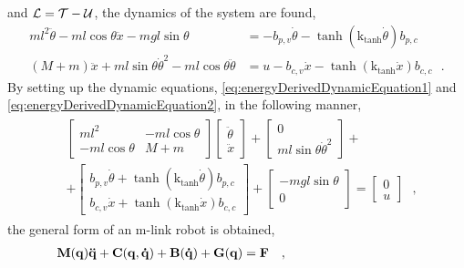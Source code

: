 and $\cal{L} = T-U$, the dynamics of the system are found,
\begin{align}
  m l^2 \ddot{\theta} - m l \cos \theta \ddot{x} - m g l \sin \theta  &= -b_{p,v} \dot{\theta} - \tanh(\text{k}_\text{tanh}\dot{\theta}) b_{p,c} \label{eq:energyDerivedDynamicEquation2} \\
  ( M + m )\ddot{x} + m l \sin \theta \dot{\theta}^2 - m l \cos \theta \ddot{\theta}  &=  u - b_{c,v} \dot{x} - \tanh(\text{k}_\text{tanh}\dot{x}) b_{c,c} \ \ \ .
  \label{eq:energyDerivedDynamicEquation1}
\end{align}
By setting up the dynamic equations, \autoref{eq:energyDerivedDynamicEquation1} and \ref{eq:energyDerivedDynamicEquation2}, in the following manner,
%
\begin{align}
\begin{split}
  &
  \begin{bmatrix}
    m l^2              & -m l \cos \theta  \\
    -m l \cos \theta   & M + m
  \end{bmatrix}
  \begin{bmatrix}
    \ddot{\theta}  \\
    \ddot{x}
  \end{bmatrix}
  +
  \begin{bmatrix}
    0  \\
    m l \sin \theta \dot{\theta}^2
  \end{bmatrix}
  +   \\
  &+
  \begin{bmatrix}
    b_{p,v} \dot{\theta} + \tanh(\text{k}_\text{tanh}\dot{\theta}) b_{p,c}    \\
    b_{c,v} \dot{x} + \tanh(\text{k}_\text{tanh}\dot{x}) b_{c,c}
  \end{bmatrix}
  +
  \begin{bmatrix}
    -m g l \sin \theta  \\
    0
  \end{bmatrix}
  =
  \begin{bmatrix}
    0  \\
    u
  \end{bmatrix} \ \ \ , 
\end{split}
\label{eq:thetaXdynamics}
\end{align}
%
the general form of an m-link robot is obtained, \cite{MWSpong, LSciavicco}
\begin{align}
  \vec{M}(\vec{q})\vec{\ddot{q}} + \vec{C}(\vec{q},\vec{\dot{q}}) + \vec{B}(\vec{\dot{q}}) + \vec{G}(\vec{q}) &= \vec{F} \ \ \ , \hspace{3.3cm}
\end{align}
\begin{where}
                      {}
    {}
                            {}
                {}
          {}
\end{where}

